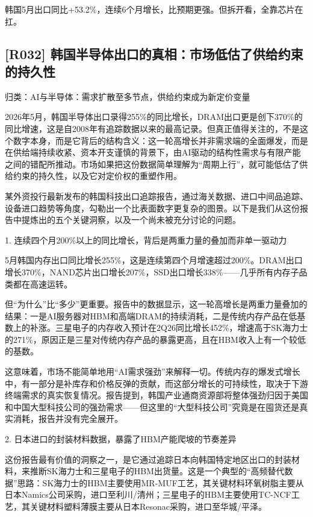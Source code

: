 \documentclass[11pt]{ctexart}
\begin{document}
韩国5月出口同比+53.2\%，连续6个月增长，比预期更强。但拆开看，全靠芯片在扛。

\subsection{[R032] 韩国半导体出口的真相：市场低估了供给约束的持久性}
{\small\color{refgray}归类：AI与半导体：需求扩散至多节点，供给约束成为新定价变量}

2026年5月，韩国半导体出口录得255\%的同比增长，DRAM出口更是创下370\%的同比增速，这是自2008年有追踪数据以来的最高记录。但真正值得关注的，不是这个数字本身，而是它背后的结构含义：这一轮高增长并非需求端的全面爆发，而是在供给端持续收紧、资本开支谨慎的背景下，由AI驱动的结构性需求与有限产能之间的错配所推动。市场如果把这份数据简单理解为“周期上行”，就可能低估了供给约束的持久性，以及它对定价权的重塑作用。

某外资投行最新发布的韩国科技出口追踪报告，通过海关数据、进口中间品追踪、设备进口趋势等角度，勾勒出一个比表面数字更复杂的图景。以下是我们从这份报告中提炼出的五个关键洞察，以及一个尚未被充分讨论的问题。

1. 连续四个月200\%以上的同比增长，背后是两重力量的叠加而非单一驱动力

5月韩国内存出口同比增长255\%，这是连续第四个月增速超过200\%。DRAM出口增长370\%，NAND芯片出口增长207\%，SSD出口增长338\%——几乎所有内存子品类都在高速运转。

但“为什么”比“多少”更重要。报告中的数据显示，这一轮高增长是两重力量叠加的结果：一是AI服务器对HBM和高端DRAM的持续消耗，二是传统内存产品在低基数上的补涨。三星电子的内存收入预计在2Q26同比增长452\%，增速高于SK海力士的271\%，原因正是三星对传统内存产品的暴露更高，且在HBM收入上有一个较低的基数。

这意味着，市场不能简单地用“AI需求强劲”来解释一切。传统内存的爆发式增长中，有一部分是补库存和价格反弹的贡献，而这部分增长的可持续性，取决于下游终端需求的真实恢复情况。报告提到，韩国产业通商资源部将整体强劲归因于美国和中国大型科技公司的强劲需求——但这里的“大型科技公司”究竟是在囤货还是真实消耗，报告并没有完全展开。

2. 日本进口的封装材料数据，暴露了HBM产能爬坡的节奏差异

这份报告最有价值的洞察之一，是它通过追踪日本向韩国特定地区出口的封装材料，来推断SK海力士和三星电子的HBM出货量。这是一个典型的“高频替代数据”思路：SK海力士的HBM主要使用MR-MUF工艺，其关键材料环氧树脂主要从日本Namics公司采购，进口至利川/清州；三星电子的HBM主要使用TC-NCF工艺，其关键材料塑料薄膜主要从日本Resonac采购，进口至华城/平泽。
\end{document}
